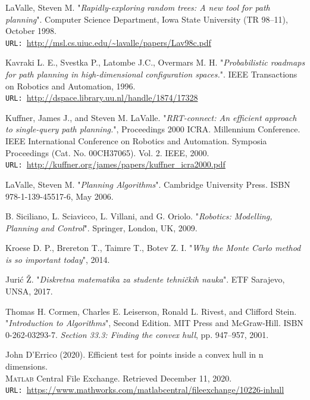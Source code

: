 \documentclass[12pt]{article}
\numberwithin{equation}{section}
\begin{document}
\begin{spacing}{1.5}
\begin{thebibliography}{8}
		LaValle, Steven M. "\textit{Rapidly-exploring random trees: A new tool for path planning}". Computer Science Department, Iowa State University (TR 98–11), October 1998.\\
		\texttt{URL: }\url{http://msl.cs.uiuc.edu/~lavalle/papers/Lav98c.pdf}
		
		Kavraki L. E., Svestka P., Latombe J.C., Overmars M. H. "\textit{Probabilistic roadmaps for path planning in high-dimensional configuration spaces.}". IEEE Transactions on Robotics and Automation, 1996. \\
		\texttt{URL: }\url{http://dspace.library.uu.nl/handle/1874/17328}
		
		Kuffner, James J., and Steven M. LaValle. "\textit{RRT-connect: An efficient approach to single-query path planning.}", Proceedings 2000 ICRA. Millennium Conference. IEEE International Conference on Robotics and Automation. Symposia Proceedings (Cat. No. 00CH37065). Vol. 2. IEEE, 2000. \\
		\texttt{URL: }\url{http://kuffner.org/james/papers/kuffner_icra2000.pdf}
		
		LaValle, Steven M. "\textit{Planning Algorithms}". Cambridge University Press. ISBN 978-1-139-45517-6, May 2006.
		
		B. Siciliano, L. Sciavicco, L. Villani, and G. Oriolo. "\textit{Robotics: Modelling, Planning and Control}". Springer, London, UK, 2009.
		
		Kroese D. P., Brereton T., Taimre T., Botev Z. I. "\textit{Why the Monte Carlo method is so important today}", 2014.
		
		Jurić Ž. "\textit{Diskretna matematika za studente tehničkih nauka}". ETF Sarajevo, UNSA, 2017. 
		
		Thomas H. Cormen, Charles E. Leiserson, Ronald L. Rivest, and Clifford Stein. "\textit{Introduction to Algorithms}", Second Edition. MIT Press and McGraw-Hill. ISBN 0-262-03293-7. \textit{Section 33.3: Finding the convex hull}, pp. 947–957, 2001.
		
		John D'Errico (2020). Efficient test for points inside a convex hull in n dimensions. \\ \textsc{Matlab} Central File Exchange. Retrieved December 11, 2020. \\ \texttt{URL: }\url{https://www.mathworks.com/matlabcentral/fileexchange/10226-inhull}
		

\end{thebibliography}
\end{spacing}
\end{document}
